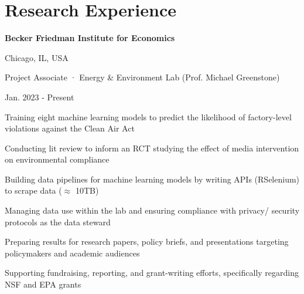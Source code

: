 \documentclass[a4paper,20pt]{article}
\begin{document}
\vspace{-5pt}
\section{Research Experience}
    \begin{minipage}{.75\linewidth} \begin{flushleft}
    		\textbf{Becker Friedman Institute for Economics}
    	\end{flushleft} \end{minipage}
    \hfill 
    \begin{minipage}{.20\linewidth}\begin{flushright}
    	 Chicago, IL, USA
    	\end{flushright}\end{minipage}
     
    \begin{minipage}{.75\linewidth} \begin{flushleft}
    		Project Associate · Energy \& Environment Lab (Prof. Michael Greenstone)
    	\end{flushleft} \end{minipage}
    \hfill 
    \begin{minipage}{.20\linewidth}\begin{flushright}
    	 Jan. 2023 - Present
    	\end{flushright}\end{minipage}
        \vspace{-5pt}
	\begin{description}[font=$\bullet$]
	\item{Training eight machine learning models to predict the likelihood of factory-level violations against the Clean Air Act}
        \vspace{-7pt}
        \item{Conducting lit review to inform an RCT studying the effect of media intervention on environmental compliance}
        \vspace{-7pt}
        \item{Building data pipelines for machine learning models by writing APIs (RSelenium) to scrape data ($\approx$ 10TB)} 
        \vspace{-7pt}
        \item{Managing data use within the lab and ensuring compliance with privacy/ security protocols as the data steward}
        \vspace{-7pt}
        \item{Preparing results for research papers, policy briefs, and presentations targeting policymakers and academic audiences}
        \vspace{-7pt}
        \item{Supporting fundraising, reporting, and grant-writing efforts, specifically regarding NSF and EPA grants}
\end{description}
\end{document}

